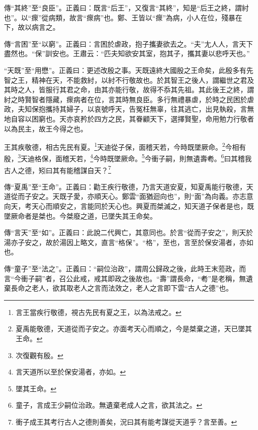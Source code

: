 {\noindent\zhuan{}\fzbyks 傳“其終”至“良臣”。正義曰：既言“后王”，又復言“其終”，知是“后王之終，謂紂也”。以“瘝”從病類，故言“瘝病”也。鄭、王皆以“瘝”為病，小人在位，殘暴在下，故以病言之。 \par}

{\noindent\zhuan{}\fzbyks 傳“言困”至“以窮”。正義曰：言困於虐政，抱子攜妻欲去之。“夫”尢人人，言天下盡然也。“保”訓安也。王肅云：“匹夫知欲安其室，抱其子，攜其妻以悲呼天也。” \par}

{\noindent\shu{}\fzkt “天既”至“用懋”。正義曰：更述改殷之事。天既遠終大國殷之王命矣，此殷多有先智之王，精神在天，不能救紂，以紂不行敬故也。於其智王之後人，謂繼世之君及其時之人，皆服行其君之命，由其亦能行敬，故得不忝其先祖。其此後王之終，謂紂之時賢智者隱藏，瘝病者在位，言其時無良臣。多行無禮暴虐，於時之民困於虐政，夫知保抱攜持其婦子，以哀號呼天，告冤枉無辜，往其逃亡，出見執殺，言無地自容以困窮也。天亦哀矜於四方之民，其眷顧天下，選擇賢聖，命用勉力行敬者以為民主，故王今得之也。 \par}

王其疾敬德，相古先民有夏。\footnote{言王當疾行敬德，視古先民有夏之王，以為法戒之。}天迪從子保，面稽天若，今時既墜厥命。\footnote{夏禹能敬德，天道從而子安之。亦面考天心而順之，今是桀棄之道，天已墜其王命。}今相有殷，\footnote{次復觀有殷。}天迪格保，面稽天若，\footnote{言天道所以至於保安湯者，亦如。}今時既墜厥命。\footnote{墜其王命。}今衝子嗣，則無遺壽耇。\footnote{童子，言成王少嗣位治政。無遺棄老成人之言，欲其法之。}曰其稽我古人之德，矧曰其有能稽謀自天？\footnote{衝子成王其考行古人之德則善矣，況曰其有能考謀從天道乎？言至善。}


{\noindent\zhuan{}\fzbyks 傳“夏禹”至“王命”。正義曰：勸王疾行敬德，乃言天道安夏，知夏禹能行敬德，天道從而子安之。天既子愛，亦順天心。鄭雲“面猶迴向也”，則“面”為向義。亦志意向天，考天心而順安之，言能同於天心也。興夏而桀滅之，知天道子保者是也，既墜厥命者是桀也。今桀廢之道，已墜失其王命矣。 \par}

{\noindent\zhuan{}\fzbyks 傳“言天”至“如”。正義曰：此說二代興亡，其意同也。於言“從而子安之”，則天於湯亦子安之，故於湯因上略文，直言“格保”。“格”，至也，言至於保安湯者，亦如也。 \par}

{\noindent\zhuan{}\fzbyks 傳“童子”至“法之”。正義曰：“嗣位治政”，謂周公歸政之後，此時王末蒞政，而言“今衝子嗣”者，召公此戒，戒其即政之後故也。“壽”謂長命，“耇”是老稱，無遺棄長命之老人，欲其取老人之言而法效之，老人之言即下雲“古人之德”也。 \par}

